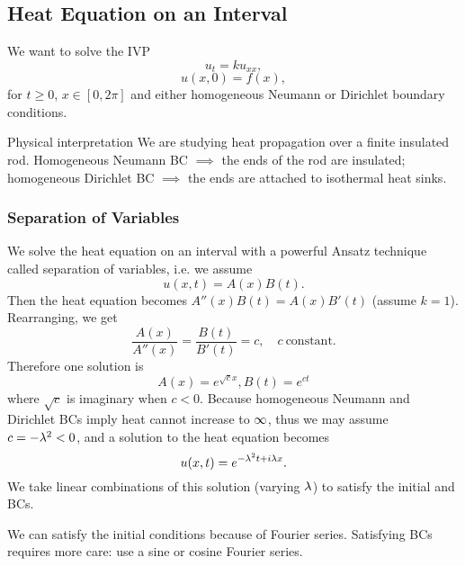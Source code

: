 \subsection{Heat Equation on an Interval}
We want to solve the IVP
\[
    u_t = ku_{xx},
\]
\[
    u(x,0) = f(x),
\]
for $t \geq 0$, $x \in [0, 2\pi]$ and either homogeneous Neumann or Dirichlet boundary conditions.
\begin{details}{Physical interpretation}
    We are studying heat propagation over a finite insulated rod. Homogeneous Neumann BC $\implies$ the ends of the rod are insulated; homogeneous Dirichlet BC $\implies$ the ends are attached to isothermal heat sinks.
\end{details}

\subsubsection{Separation of Variables}
We solve the heat equation on an interval with a powerful Ansatz technique called separation of variables, i.e. we assume
\[
    u(x,t) = A(x)B(t).
\]
Then the heat equation becomes $A''(x)B(t) = A(x)B'(t)$ (assume $k = 1$). Rearranging, we get
\[
    \frac{A(x)}{A''(x)} = \frac{B(t)}{B'(t)} = c, \quad c \ \text{constant}.
\]
Therefore one solution is
\[
    A(x) = e^{\sqrt{c}x}, B(t) = e^{ct}
\]
where $\sqrt{c}$ is imaginary when $c < 0$. Because homogeneous Neumann and Dirichlet BCs imply heat cannot increase to $\infty$, thus we may assume $c = -\lambda^2 < 0$, and a solution to the heat equation becomes
\[
    u(x,t) = e^{-\lambda^2t + i\lambda x}.
\]
We take linear combinations of this solution (varying $\lambda$) to satisfy the initial and BCs.
\begin{remark}
    We can satisfy the initial conditions because of Fourier series. Satisfying BCs requires more care: use a sine or cosine Fourier series.
\end{remark}



